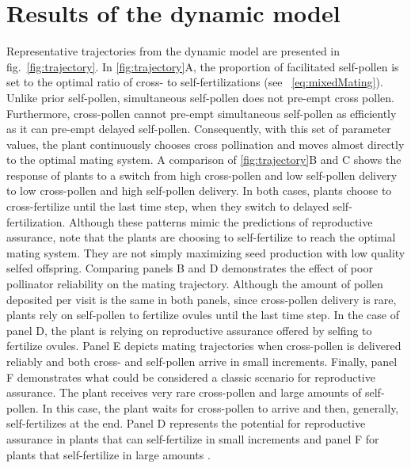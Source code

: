 \documentclass[letterpaper,titlepage]{scrartcl}
\newcommand{\species}[1]{\textit{#1}} \newcommand{\fref}{fig.}
\begin{document}
\section{Results of the dynamic model}
Representative trajectories from the dynamic model are presented in
{\fref}~\ref{fig:trajectory}. In \ref{fig:trajectory}A, the proportion
of facilitated self-pollen is set to the optimal ratio of cross- to
self-fertilizations (see {\eref}~\eqref{eq:mixedMating}). Unlike prior
self-pollen, simultaneous self-pollen does not pre-empt cross
pollen. Furthermore, cross-pollen cannot pre-empt simultaneous
self-pollen as efficiently as it can pre-empt delayed
self-pollen. Consequently, with this set of parameter values, the
plant continuously chooses cross pollination and moves almost directly
to the optimal mating system. A comparison of \ref{fig:trajectory}B
and C shows the response of plants to a switch from high cross-pollen
and low self-pollen delivery to low cross-pollen and high self-pollen
delivery. In both cases, plants choose to cross-fertilize until the
last time step, when they switch to delayed
self-fertilization. Although these patterns mimic the predictions of
reproductive assurance, note that the plants are choosing to
self-fertilize to reach the optimal mating system. They are not simply
maximizing seed production with low quality selfed
offspring. Comparing panels B and D demonstrates the effect of poor
pollinator reliability on the mating trajectory. Although the amount
of pollen deposited per visit is the same in both panels, since
cross-pollen delivery is rare, plants rely on self-pollen to fertilize
ovules until the last time step. In the case of panel D, the plant is
relying on reproductive assurance offered by selfing to fertilize
ovules. Panel E depicts mating trajectories when cross-pollen is
delivered reliably and both cross- and self-pollen arrive in small
increments.%
Finally, panel F demonstrates what could be considered a
classic scenario for reproductive assurance. The plant receives very
rare cross-pollen and large amounts of self-pollen. In this case, the
plant waits for cross-pollen to arrive and then, generally,
self-fertilizes at the end. Panel D represents the potential for
reproductive assurance in plants that can self-fertilize in small
increments \citetext{e.g., the changes in herkogamy found in
  \species{Aquilegia canadensis}; \citealp{Griffin00}} and panel F for
plants that self-fertilize in large amounts \citetext{e.g., delayed
  selfing through corolla abscission in \species{Mimulus guttatus};
  \citealp{Dole90}}.
\end{document}
